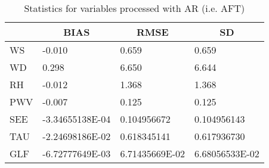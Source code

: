 \documentclass[11pt,english]{article}
\begin{document}
\begin{table}[]
\begin{center}
\begin{tabular}{|l|l|l|l|}
\hline
                            & \multicolumn{1}{c|}{\cellcolor[HTML]{C0C0C0}\textbf{BIAS}} & \multicolumn{1}{c|}{\cellcolor[HTML]{C0C0C0}\textbf{RMSE}} & \multicolumn{1}{c|}{\cellcolor[HTML]{C0C0C0}\textbf{SD}} \\\hline
\cellcolor[HTML]{C0C0C0}WS  &    -0.010                                &     0.659                                &     0.659                                \\
\cellcolor[HTML]{C0C0C0}WD  &     0.298                                &     6.650                                &     6.644                                \\
\cellcolor[HTML]{C0C0C0}RH  &    -0.012                                &     1.368                                &     1.368                                \\
\cellcolor[HTML]{C0C0C0}PWV &    -0.007                               &     0.125                               &     0.125                               \\
\cellcolor[HTML]{C0C0C0}SEE &   -3.34655138E-04                               &   0.104956672                                   &   0.104956143                                   \\
\cellcolor[HTML]{C0C0C0}TAU &   -2.24698186E-02                               &   0.618345141                                   &   0.617936730                                   \\
\cellcolor[HTML]{C0C0C0}GLF &   -6.72777649E-03                               &    6.71435669E-02                               &    6.68056533E-02                               \\
\hline
\end{tabular}
\caption{Statistics for variables processed with AR (i.e. AFT)}
\end{center}
\end{table}
\clearpage
\end{document}
